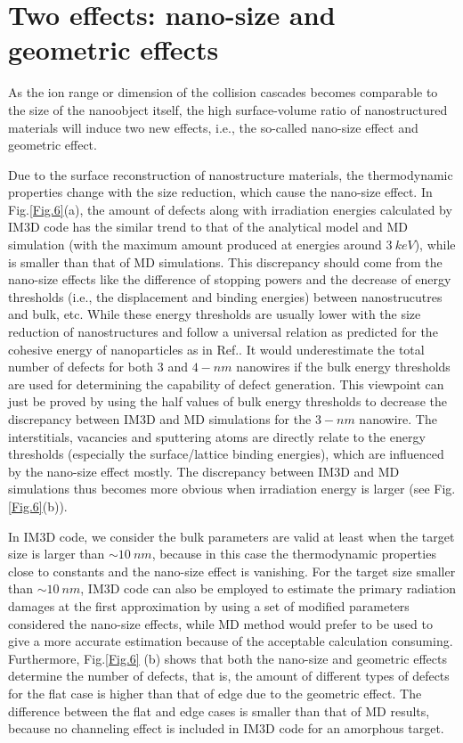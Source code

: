 \section{Two effects: nano-size and geometric effects}

As the ion range or dimension of the collision cascades becomes comparable to the size of the nanoobject itself, the high surface-volume ratio of nanostructured materials will induce two new effects, i.e., the so-called nano-size effect and geometric effect.

Due to the surface reconstruction of nanostructure materials, the thermodynamic properties change with the size reduction, which cause the nano-size effect. In Fig.\ref{Fig.6}(a), the amount of defects along with irradiation energies calculated by IM3D code has the similar trend to that of the analytical model and MD simulation (with the maximum amount produced at energies around $3~keV$), while is smaller than that of MD simulations. This discrepancy should come from the nano-size effects like the difference of stopping powers and the decrease of energy thresholds (i.e., the displacement and binding energies) between nanostrucutres and bulk, etc. While these energy thresholds are usually lower with the size reduction of nanostructures and follow a universal relation as predicted for the cohesive energy of nanoparticles as in Ref.\cite{Vanithakumari:2008}. It would underestimate the total number of defects for both $3$ and $4-nm$ nanowires if the bulk energy thresholds are used for determining the capability of defect generation. This viewpoint can just be proved by using the half values of bulk energy thresholds to decrease the discrepancy between IM3D and MD simulations for the $3-nm$ nanowire. The interstitials, vacancies and sputtering atoms are directly relate to the energy thresholds (especially the surface/lattice binding energies), which are influenced by the nano-size effect mostly. The discrepancy between IM3D and MD simulations thus becomes more obvious when irradiation energy is larger (see Fig.\ref{Fig.6}(b)).

In IM3D code, we consider the bulk parameters are valid at least when the target size is larger than $\sim 10~nm$, because in this case the thermodynamic properties close to constants and the nano-size effect is vanishing\cite{Ouyang:2008}. For the target size smaller than $\sim 10~nm$, IM3D code can also be employed to estimate the primary radiation damages at the first approximation by using a set of modified parameters considered the nano-size effects, while MD method would prefer to be used to give a more accurate estimation because of the acceptable calculation consuming. Furthermore, Fig.\ref{Fig.6} (b) shows that both the nano-size and geometric effects determine the number of defects, that is, the amount of different types of defects for the flat case is higher than that of edge due to the geometric effect. The difference between the flat and edge cases is smaller than that of MD results\cite{Ren:2012}, because no channeling effect is included in IM3D code for an amorphous target.

